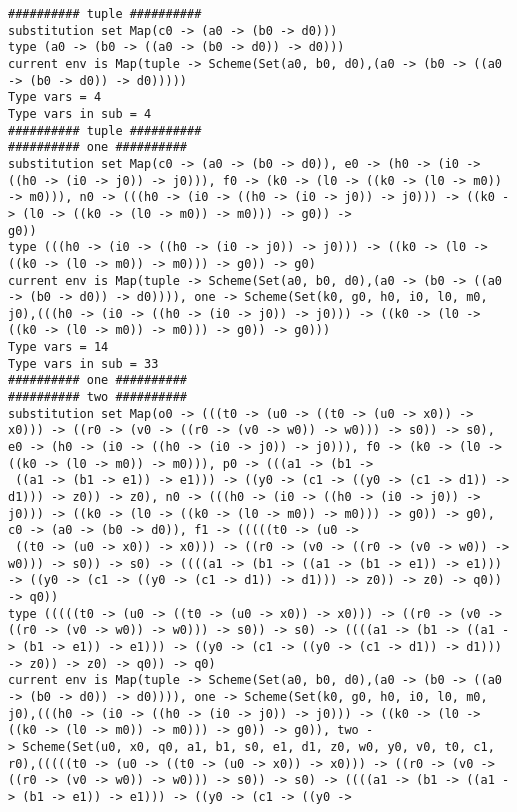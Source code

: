 \documentclass[11pt,oneside,a4paper]{report}
\begin{document}
\begin{lstlisting}[breaklines=true,caption={The output of an exponential type},label=lst:appedix:bigexp]
########## tuple ##########
substitution set Map(c0 -> (a0 -> (b0 -> d0)))
type (a0 -> (b0 -> ((a0 -> (b0 -> d0)) -> d0)))
current env is Map(tuple -> Scheme(Set(a0, b0, d0),(a0 -> (b0 -> ((a0 -> (b0 -> d0)) -> d0)))))
Type vars = 4
Type vars in sub = 4
########## tuple ##########
########## one ##########
substitution set Map(c0 -> (a0 -> (b0 -> d0)), e0 -> (h0 -> (i0 -> ((h0 -> (i0 -> j0)) -> j0))), f0 -> (k0 -> (l0 -> ((k0 -> (l0 -> m0)) -> m0))), n0 -> (((h0 -> (i0 -> ((h0 -> (i0 -> j0)) -> j0))) -> ((k0 -> (l0 -> ((k0 -> (l0 -> m0)) -> m0))) -> g0)) ->
g0))
type (((h0 -> (i0 -> ((h0 -> (i0 -> j0)) -> j0))) -> ((k0 -> (l0 -> ((k0 -> (l0 -> m0)) -> m0))) -> g0)) -> g0)
current env is Map(tuple -> Scheme(Set(a0, b0, d0),(a0 -> (b0 -> ((a0 -> (b0 -> d0)) -> d0)))), one -> Scheme(Set(k0, g0, h0, i0, l0, m0, j0),(((h0 -> (i0 -> ((h0 -> (i0 -> j0)) -> j0))) -> ((k0 -> (l0 -> ((k0 -> (l0 -> m0)) -> m0))) -> g0)) -> g0)))
Type vars = 14
Type vars in sub = 33
########## one ##########
########## two ##########
substitution set Map(o0 -> (((t0 -> (u0 -> ((t0 -> (u0 -> x0)) -> x0))) -> ((r0 -> (v0 -> ((r0 -> (v0 -> w0)) -> w0))) -> s0)) -> s0), e0 -> (h0 -> (i0 -> ((h0 -> (i0 -> j0)) -> j0))), f0 -> (k0 -> (l0 -> ((k0 -> (l0 -> m0)) -> m0))), p0 -> (((a1 -> (b1 ->
 ((a1 -> (b1 -> e1)) -> e1))) -> ((y0 -> (c1 -> ((y0 -> (c1 -> d1)) -> d1))) -> z0)) -> z0), n0 -> (((h0 -> (i0 -> ((h0 -> (i0 -> j0)) -> j0))) -> ((k0 -> (l0 -> ((k0 -> (l0 -> m0)) -> m0))) -> g0)) -> g0), c0 -> (a0 -> (b0 -> d0)), f1 -> (((((t0 -> (u0 ->
 ((t0 -> (u0 -> x0)) -> x0))) -> ((r0 -> (v0 -> ((r0 -> (v0 -> w0)) -> w0))) -> s0)) -> s0) -> ((((a1 -> (b1 -> ((a1 -> (b1 -> e1)) -> e1))) -> ((y0 -> (c1 -> ((y0 -> (c1 -> d1)) -> d1))) -> z0)) -> z0) -> q0)) -> q0))
type (((((t0 -> (u0 -> ((t0 -> (u0 -> x0)) -> x0))) -> ((r0 -> (v0 -> ((r0 -> (v0 -> w0)) -> w0))) -> s0)) -> s0) -> ((((a1 -> (b1 -> ((a1 -> (b1 -> e1)) -> e1))) -> ((y0 -> (c1 -> ((y0 -> (c1 -> d1)) -> d1))) -> z0)) -> z0) -> q0)) -> q0)
current env is Map(tuple -> Scheme(Set(a0, b0, d0),(a0 -> (b0 -> ((a0 -> (b0 -> d0)) -> d0)))), one -> Scheme(Set(k0, g0, h0, i0, l0, m0, j0),(((h0 -> (i0 -> ((h0 -> (i0 -> j0)) -> j0))) -> ((k0 -> (l0 -> ((k0 -> (l0 -> m0)) -> m0))) -> g0)) -> g0)), two -
> Scheme(Set(u0, x0, q0, a1, b1, s0, e1, d1, z0, w0, y0, v0, t0, c1, r0),(((((t0 -> (u0 -> ((t0 -> (u0 -> x0)) -> x0))) -> ((r0 -> (v0 -> ((r0 -> (v0 -> w0)) -> w0))) -> s0)) -> s0) -> ((((a1 -> (b1 -> ((a1 -> (b1 -> e1)) -> e1))) -> ((y0 -> (c1 -> ((y0 ->

\end{lstlisting}
\end{document}
